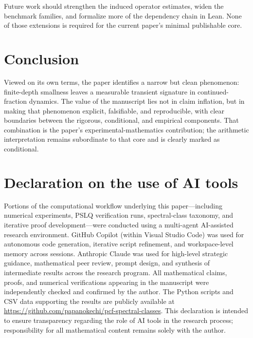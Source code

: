 \documentclass[11pt]{article}
\begin{document}
Future work should strengthen the induced operator estimates, widen the benchmark families, and formalize more of the dependency chain in Lean. None of those extensions is required for the current paper's minimal publishable core.

\section{Conclusion}

Viewed on its own terms, the paper identifies a narrow but clean phenomenon: finite-depth smallness leaves a measurable transient signature in continued-fraction dynamics. The value of the manuscript lies not in claim inflation, but in making that phenomenon explicit, falsifiable, and reproducible, with clear boundaries between the rigorous, conditional, and empirical components. That combination is the paper's experimental-mathematics contribution; the arithmetic interpretation remains subordinate to that core and is clearly marked as conditional.

\section*{Declaration on the use of AI tools}

Portions of the computational workflow underlying this paper---including numerical experiments, PSLQ verification runs, spectral-class taxonomy, and iterative proof development---were conducted using a multi-agent AI-assisted research environment. GitHub Copilot (within Visual Studio Code) was used for autonomous code generation, iterative script refinement, and workspace-level memory across sessions. Anthropic Claude was used for high-level strategic guidance, mathematical peer review, prompt design, and synthesis of intermediate results across the research program. All mathematical claims, proofs, and numerical verifications appearing in the manuscript were independently checked and confirmed by the author. The Python scripts and CSV data supporting the results are publicly available at \url{https://github.com/papanokechi/pcf-spectral-classes}. This declaration is intended to ensure transparency regarding the role of AI tools in the research process; responsibility for all mathematical content remains solely with the author.
\end{document}
